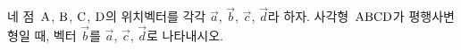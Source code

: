 네 점~$\mathrm{A}$, $\mathrm{B}$, $\mathrm{C}$, $\mathrm{D}$의 위치벡터를 각각 $\vec{a}$, $\vec{b}$, $\vec{c}$, $\vec{d}$라 하자. 사각형~$\mathrm{ABCD}$가 평행사변형일 때, 벡터 $\vec{b}$를 $\vec{a}$, $\vec{c}$, $\vec{d}$로 나타내시오.
